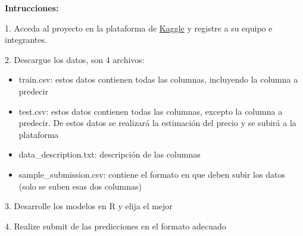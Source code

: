 \documentclass{../oxmathproblems}
\begin{document}
\textbf{Intrucciones:}

1. Acceda al proyecto en la plataforma de \href{https://www.kaggle.com/t/d0de518d6d7a41b8b367fa01bf92ce64}{Kaggle} y registre a su equipo e integrantes. 

\qquad 

2. Descargue los datos, son 4 archivos:
\begin{itemize}
\item train.csv: estos datos contienen todas las columnas, incluyendo la columna a predecir
\item test.csv: estos datos contienen todas las columnas, excepto la columna a predecir. De estos datos se realizará la estimación del precio y se subirá a la plataforma
\item data\_description.txt: descripción de las columnas 
\item sample\_submission.csv: contiene el formato en que deben subir los datos (solo se suben esas dos columnas)
\end{itemize}

\qquad

3. Desarrolle los modelos en R y elija el mejor

\qquad

4. Realize submit de las predicciones en el formato adecuado
\end{document}
